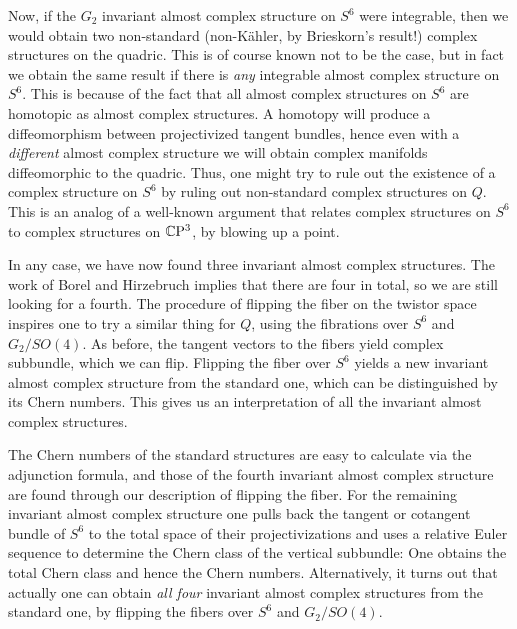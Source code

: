 \documentclass[parskip=half]{scrartcl}
\begin{document}
Now, if the $G_2$ invariant almost complex structure on $S^6$ were integrable, then we would obtain two non-standard (non-K\"ahler, by Brieskorn's result!) complex structures on the quadric. This is of course known not to be the case, but in fact we obtain the same result if there is \emph{any} integrable almost complex structure on $S^6$. This is because of the fact that all almost complex structures on $S^6$ are homotopic as almost complex structures. A homotopy will produce a diffeomorphism between projectivized tangent bundles, hence even with a \emph{different} almost complex structure we will obtain complex manifolds diffeomorphic to the quadric. Thus, one might try to rule out the existence of a complex structure on $S^6$ by ruling out non-standard complex structures on $Q$. This is an analog of a well-known argument that relates complex structures on $S^6$ to complex structures on $\mathbb{C}\mathrm{P}^3$, by blowing up a point.

In any case, we have now found three invariant almost complex structures. The work of Borel and Hirzebruch implies that there are four in total, so we are still looking for a fourth. The procedure of flipping the fiber on the twistor space inspires one to try a similar thing for $Q$, using the fibrations over $S^6$ and $G_2/SO(4)$. As before, the tangent vectors to the fibers yield complex subbundle, which we can flip. Flipping the fiber over $S^6$ yields a new invariant almost complex structure from the standard one, which can be distinguished by its Chern numbers. This gives us an interpretation of all the invariant almost complex structures. 

The Chern numbers of the standard structures are easy to calculate via the adjunction formula, and those of the fourth invariant almost complex structure are found through our description of flipping the fiber. For the remaining invariant almost complex structure one pulls back the tangent or cotangent bundle of $S^6$ to the total space of their projectivizations and uses a relative Euler sequence to determine the Chern class of the vertical subbundle: One obtains the total Chern class and hence the Chern numbers. Alternatively, it turns out that actually one can obtain \emph{all four} invariant almost complex structures from the standard one, by flipping the fibers over $S^6$ and $G_2/SO(4)$.
\end{document}
